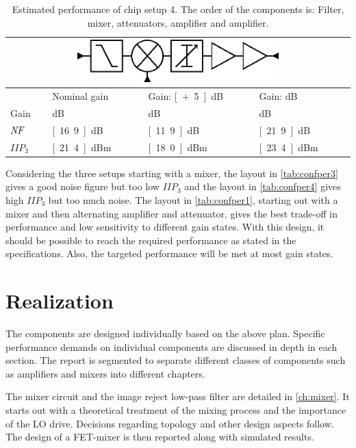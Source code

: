 		\begin{table}[hpt!]
			\caption[Estimated performance of chip setup 4.]{Estimated performance of chip setup 4. The order of the components is: Filter, mixer, attenuators, amplifier and amplifier.}
			\label{tab:confper4}
			\centering
			\begin{tabular}{ l l l l }
				\multicolumn{4}{c}{\includegraphics[width=0.6\textwidth]{fig/system/sys4}} \\\toprule
				& Nominal gain & Gain: \unit[+5]{dB} & Gain: \unit[-5]{dB} \\\midrule
				Gain & \unit[9]{dB} & \unit[14]{dB} & \unit[4]{dB} \\
				$\emph{NF}$ & \unit[16.9]{dB} & \unit[11.9]{dB} & \unit[21.9]{dB} \\
				$IIP_3$ & \unit[21.4]{dBm} & \unit[18.0]{dBm} & \unit[23.4]{dBm} \\\bottomrule
			\end{tabular}
		\end{table}

		Considering the three setups starting with a mixer, the layout in \autoref{tab:confper3} gives a good noise figure but too low $IIP_3$ and the layout in \autoref{tab:confper4} gives high $IIP_3$ but too much noise. The layout in \autoref{tab:confper1}, starting out with a mixer and then alternating amplifier and attenuator, gives the best trade-off in performance and low sensitivity to different gain states. With this design, it should be possible to reach the required performance as stated in the specifications. Also, the targeted performance will be met at most gain states.

	\section{Realization}
		The components are designed individually based on the above plan. Specific performance demands on individual components are discussed in depth in each section. The report is segmented to separate different classes of components such as amplifiers and mixers into different chapters.

		The mixer circuit and the image reject low-pass filter are detailed in \autoref{ch:mixer}. It starts out with a theoretical treatment of the mixing process and the importance of the LO drive. Decisions regarding topology and other design aspects follow. The design of a FET-mixer is then reported along with simulated results.

